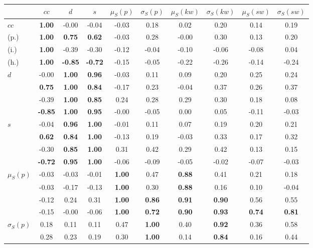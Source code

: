 \begin{table*}[h!]
\begin{center}
\begin{tabular}{| l || c | c | c | c | c | c | c | c | c |}\hline
 & $cc$ & $d$ & $s$ & $\mu_S(p)$ & $\sigma_S(p)$ & $\mu_S(kw)$ & $\sigma_S(kw)$ & $\mu_S(sw)$ & $\sigma_S(sw)$ \\\hline\hline
$cc$ & {\bf 1.00} & -0.00 & -0.04 & -0.03 & 0.18 & 0.02 & 0.20 & 0.14 & 0.19 \\
(p.) & {\bf 1.00} & {\bf 0.75} & {\bf 0.62} & -0.03 & 0.28 & -0.00 & 0.30 & 0.13 & 0.20 \\
(i.) & {\bf 1.00} & -0.39 & -0.30 & -0.12 & -0.04 & -0.10 & -0.06 & -0.08 & 0.04 \\
(h.) & {\bf 1.00} & {\bf -0.85} & {\bf -0.72} & -0.15 & -0.05 & -0.22 & -0.26 & -0.14 & -0.24 \\\hline
$d$ & -0.00 & {\bf 1.00} & {\bf 0.96} & -0.03 & 0.11 & 0.09 & 0.20 & 0.25 & 0.24 \\
 & {\bf 0.75} & {\bf 1.00} & {\bf 0.84} & -0.17 & 0.23 & -0.04 & 0.37 & 0.26 & 0.37 \\
 & -0.39 & {\bf 1.00} & {\bf 0.85} & 0.24 & 0.28 & 0.29 & 0.30 & 0.18 & 0.08 \\
 & {\bf -0.85} & {\bf 1.00} & {\bf 0.95} & -0.00 & -0.05 & 0.00 & 0.05 & -0.11 & -0.03 \\\hline
$s$ & -0.04 & {\bf 0.96} & {\bf 1.00} & -0.01 & 0.11 & 0.07 & 0.19 & 0.20 & 0.21 \\
 & {\bf 0.62} & {\bf 0.84} & {\bf 1.00} & -0.13 & 0.19 & -0.03 & 0.33 & 0.17 & 0.32 \\
 & -0.30 & {\bf 0.85} & {\bf 1.00} & 0.31 & 0.42 & 0.29 & 0.42 & 0.13 & 0.15 \\
 & {\bf -0.72} & {\bf 0.95} & {\bf 1.00} & -0.06 & -0.09 & -0.05 & -0.02 & -0.07 & -0.03 \\\hline
$\mu_S(p)$ & -0.03 & -0.03 & -0.01 & {\bf 1.00} & 0.47 & {\bf 0.88} & 0.41 & 0.21 & 0.18 \\
 & -0.03 & -0.17 & -0.13 & {\bf 1.00} & 0.30 & {\bf 0.88} & 0.16 & 0.10 & -0.04 \\
 & -0.12 & 0.24 & 0.31 & {\bf 1.00} & {\bf 0.86} & {\bf 0.91} & {\bf 0.90} & 0.56 & 0.55 \\
 & -0.15 & -0.00 & -0.06 & {\bf 1.00} & {\bf 0.72} & {\bf 0.90} & {\bf 0.93} & {\bf 0.74} & {\bf 0.81} \\\hline
$\sigma_S(p)$ & 0.18 & 0.11 & 0.11 & 0.47 & {\bf 1.00} & 0.40 & {\bf 0.92} & 0.36 & 0.58 \\
 & 0.28 & 0.23 & 0.19 & 0.30 & {\bf 1.00} & 0.14 & {\bf 0.84} & 0.16 & 0.44 \\

\end{tabular}
\end{center}
\end{table*}
